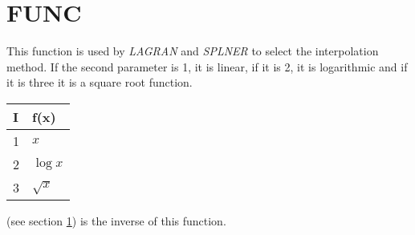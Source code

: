 \section{FUNC}
\label{sect:func}

\noindent This function is used by {\em LAGRAN} and {\em SPLNER} to select
the interpolation method. If the second parameter is 1, it is linear, if it
is 2, it is logarithmic and if it is three it is a square root function.

\begin{tabular}{|ll|}
\hline
I & f(x)\\
\hline
1 & $x$\\
2 & $\log{x}$\\
3 & $\sqrt{x}$\\
\hline
\end{tabular}

 (see section \ref{sect:func}) is the inverse of this
function.\\
